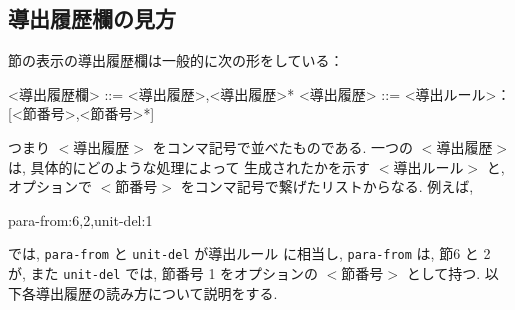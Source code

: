 \subsection{導出履歴欄の見方}
\label{sec:history}
節の表示の導出履歴欄は一般的に次の形をしている：
\begin{vvtm}
\begin{simplev}
  <導出履歴欄> ::= <導出履歴>{,<導出履歴>}*
  <導出履歴>   ::= <導出ルール>：[<節番号>{,<節番号>}*]
\end{simplev}
\end{vvtm}
つまり $<$導出履歴$>$ をコンマ記号で並べたものである.
一つの $<$導出履歴$>$ は, 具体的にどのような処理によって
生成されたかを示す $<$導出ルール$>$ と, オプションで
$<$節番号$>$ をコンマ記号で繋げたリストからなる.
例えば,
\begin{vvtm}
\begin{examplev}
  para-from:6,2,unit-del:1
\end{examplev}
\end{vvtm}
では, \texttt{para-from} と \texttt{unit-del} が導出ルール
に相当し, \texttt{para-from} は, 節6 と 2 が, また
\texttt{unit-del} では, 節番号 1 をオプションの $<$節番号$>$
として持つ. 以下各導出履歴の読み方について説明をする.
